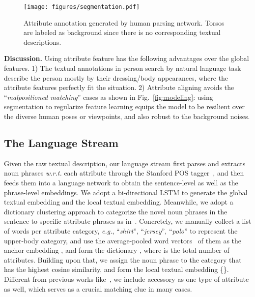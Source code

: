 \documentclass[runningheads]{llncs}
\begin{document}
\begin{figure}[t]
\centering
\texttt{[image: figures/segmentation.pdf]}
\caption{
Attribute annotation generated by human parsing network. Torsos are labeled as background since there is no corresponding textual descriptions.
}
\label{fig:annotation}
\end{figure}

\noindent\textbf{Discussion.} 
Using attribute feature has the following advantages over the global features. 1) The textual annotations in person search by natural language task describe the person mostly by their dressing/body appearances, where the attribute features perfectly fit the situation.
2) Attribute aligning avoids the ``\textit{malpositioned matching}'' cases as shown in Fig.~\ref{fig:modeling}:
using segmentation to regularize feature learning equips the model to be resilient over the diverse human poses or viewpoints, and also robust to the background noises.

\subsection{The Language Stream}
Given the raw textual description, our language stream first parses and extracts noun phrases \textit{w.r.t.} each attribute through the Stanford POS tagger~\cite{manning-EtAl:2014:P14-5}, and then feeds them into a language network to obtain the sentence-level as well as the phrase-level embeddings. We adopt a bi-directional LSTM to generate the global textual embedding  and the local textual embedding. 
Meanwhile, we adopt a dictionary clustering approach to categorize the novel noun phrases in the sentence to specific attribute phrases as in~\cite{Fang_2019_CVPR}.
Concretely, we manually collect a list of words per attribute category, \textit{e.g.}, ``\textit{shirt}'', ``\textit{jersey}'', ``\textit{polo}'' to represent the upper-body category, and use the average-pooled word vectors~\cite{goldberg2014word2vec} of them as the anchor embedding , and form the dictionary , where  is the total number of attributes. Building upon that, we assign the noun phrase to the category that has the highest cosine similarity, and form the local textual embedding \{\}. Different from previous works like~\cite{zhang2019densely,niu2019improving}, we include accessory as one type of attribute as well, which serves as a crucial matching clue in many cases. 
\end{document}
